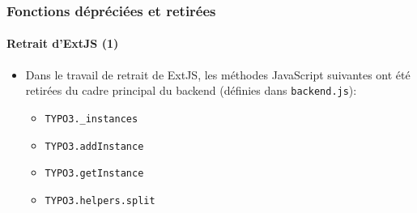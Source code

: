 \begin{frame}[fragile]
	\frametitle{Fonctions dépréciées et retirées}
	\framesubtitle{Retrait d'ExtJS (1)}

	\begin{itemize}
		\item Dans le travail de retrait de ExtJS, les méthodes JavaScript suivantes ont
			été retirées du cadre principal du backend (définies dans \texttt{backend.js}):

		\begin{itemize}
			\item \texttt{TYPO3.\_instances}
			\item \texttt{TYPO3.addInstance}
			\item \texttt{TYPO3.getInstance}
			\item \texttt{TYPO3.helpers.split}
		\end{itemize}

	\end{itemize}

\end{frame}
